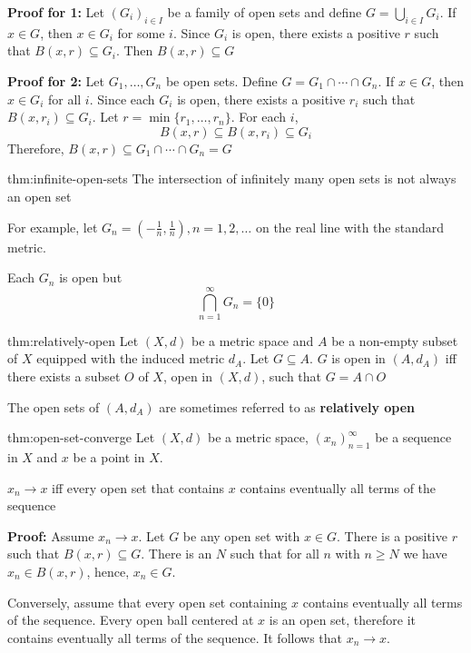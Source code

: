 \documentclass{article}
\begin{document}
\textbf{Proof for 1:} Let $(G_{i})_{i\in I}$ be a family of open sets and define $G = \bigcup_{i\in I} G_{i}$. If $x\in G$, then $x\in G_{i}$ for some $i$. Since $G_{i}$ is open, there exists a positive $r$ such that $B(x,r)\subseteq G_{i}$. Then $B(x,r)\subseteq G$


\textbf{Proof for 2:} Let $G_{1}, \dots, G_{n}$ be open sets. Define $G = G_{1} \cap \cdots \cap G_{n}$. If $x\in G$, then $x\in G_{i}$ for all $i$. Since each $G_{i}$ is open, there exists a positive $r_{i}$ such that $B(x,r_{i})\subseteq G_{i}$. Let $r = \min \{r_{1},\dots,r_{n}\}$. For each $i$,
\[B(x,r)\subseteq B(x,r_{i})\subseteq G_{i}\]
Therefore, $B(x,r)\subseteq G_{1} \cap \cdots \cap G_{n} = G$

\newpage
\begin{thm}{thm:infinite-open-sets}{}
    The intersection of infinitely many open sets is not always an open set
    
    For example, let $G_{n} = (- \frac{1}{n}, \frac{1}{n}), n = 1,2,\dots$ on the real line with the standard metric.

    Each $G_{n}$ is open but
    \[\bigcap\limits_{n = 1}^{\infty} G_{n} = \{0\}\]
\end{thm}


\begin{thm}{thm:relatively-open}{}
    Let $(X,d)$ be a metric space and $A$ be a non-empty subset of $X$ equipped with the induced metric $d_{A}$. Let $G\subseteq A$. $G$ is open in $(A, d_{A})$ iff there exists a subset $O$ of $X$, open in $(X,d)$, such that $G = A \cap O$

    The open sets of $(A, d_{A})$ are sometimes referred to as \textbf{relatively open}
\end{thm}

\begin{thm}[]{thm:open-set-converge}{}
    Let $(X, d)$ be a metric space, $(x_{n})^{\infty}_{n=1}$ be a sequence in $X$ and $x$ be a point in $X$.

    $x_{n}\to x$ iff every open set that contains $x$ contains eventually all terms of the sequence
\end{thm}

\textbf{Proof:} Assume $x_{n}\to x$. Let $G$ be any open set with $x\in G$. There is a positive $r$ such that $B(x,r) \subseteq G$. There is an $N$ such that for all $n$ with $n \ge N$ we have $x_{n}\in B(x,r)$, hence, $x_{n}\in G$.

Conversely, assume that every open set containing $x$ contains eventually all terms of the sequence. Every open ball centered at $x$ is an open set, therefore it contains eventually all terms of the sequence. It follows that $x_{n}\to x$.
\end{document}
